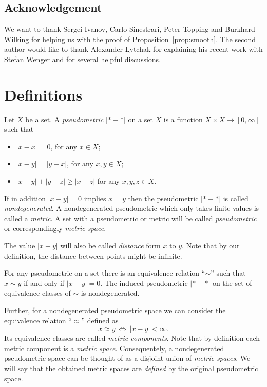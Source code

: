 \documentclass[a4paper,10pt]{amsart}
\begin{document}
\subsection{Acknowledgement}
We want to thank Sergei Ivanov, Carlo Sinestrari, Peter Topping and
Burkhard Wilking for helping us with the proof of Proposition~\ref{prop:smooth}.
The second author would like to thank Alexander Lytchak for explaining his recent work 
with Stefan Wenger and for several helpful discussions.
\medskip



\section{Definitions}\label{sec:Def}

Let $X$ be a set.
A \emph{pseudometric} $|{*}-{*}|$ on a set $X$ 
is a function $X\times X\to[0,\infty]$
such that 
\begin{itemize}
\item $|x-x|=0$, for any $x\in X$;
\item $|x-y|=|y-x|$, for any $x,y\in X$;
\item $|x-y|+|y-z|\ge|x-z|$ for any  $x,y,z\in X$.
\end{itemize}
If in addition $|x-y|=0$ implies $x=y$ then the pseudometric $|{*}-{*}|$ is called \emph{nondegenerated}.
A nondegenerated pseudometric which only takes finite values is called a \emph{metric}. A set with a pseudometric 
or metric will be called \emph{pseudometric} or correspondingly \emph{metric space}.

The value $|x-y|$ will also be called \emph{distance} form $x$ to $y$.
Note that by our definition, the distance between points might be infinite.%

For any pseudometric on a set 
there is an equivalence relation ``$\sim$''
such that $x\sim y$ if and only if $|x-y|=0$.
The induced pseudometric $|{*}-{*}|$ on the set of equivalence classes of $\sim$ is nondegenerated.

Further, for a nondegenerated pseudometric space we can consider the equivalence relation ``$\approx$'' defined as \[x\approx y\  \iff\  |x-y|<\infty.\]
Its equivalence classes are called \emph{metric components}.
Note that by definition each metric component is a \emph{metric space}.
Consequentely, a nondegenerated pseudometric space 
can be thought of as a disjoint union of \emph{metric spaces}.
We will say that the obtained metric spaces are \emph{defined} by the  
original pseudometric space.%
\end{document}
